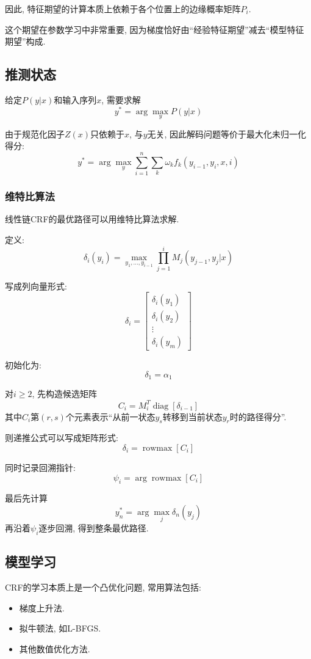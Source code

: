 因此, 特征期望的计算本质上依赖于各个位置上的边缘概率矩阵$P_i$.

这个期望在参数学习中非常重要, 因为梯度恰好由“经验特征期望”减去“模型特征期望”构成.

\subsection{推测状态}


给定$P(y|x)$和输入序列$x$, 需要求解
\[
y^* = \arg \max_y P(y|x)
\]

由于规范化因子$Z(x)$只依赖于$x$, 与$y$无关, 因此解码问题等价于最大化未归一化得分:
\[
y^*
    = \arg \max_y \sum_{i=1}^n \sum_k \omega_k f_k (y_{i-1}, y_i, x, i)
\]

\subsubsection{维特比算法}


线性链CRF的最优路径可以用维特比算法求解.

定义:
\[
\delta_i (y_i)
    = \max_{y_1, \dots, y_{i-1}}
      \prod_{j=1}^i M_j (y_{j-1}, y_j | x)
\]

写成列向量形式:
\[
\delta_i = \begin{bmatrix}\delta_i(y_1) \\ \delta_i(y_2) \\ \vdots \\ \delta_i(y_m)\end{bmatrix}
\]

初始化为:
\[
\delta_1 = \alpha_1
\]

对$i \ge 2$, 先构造候选矩阵
\[
C_i = M_i^T \operatorname{diag}[\delta_{i-1}]
\]
其中$C_i$第$(r,s)$个元素表示“从前一状态$y_s$转移到当前状态$y_r$时的路径得分”.

则递推公式可以写成矩阵形式:
\[
\delta_i = \operatorname{rowmax}[C_i]
\]

同时记录回溯指针:
\[
\psi_i = \arg\operatorname{rowmax}[C_i]
\]

最后先计算
\[
y_n^* = \arg \max_j \delta_n (y_j)
\]
再沿着$\psi_i$逐步回溯, 得到整条最优路径.

\subsection{模型学习}


CRF的学习本质上是一个凸优化问题, 常用算法包括:

\begin{itemize}
\item 梯度上升法.
\item 拟牛顿法, 如L-BFGS.
\item 其他数值优化方法.
\end{itemize}

